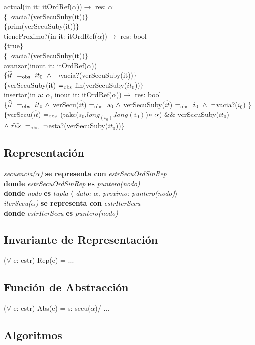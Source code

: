 actual(in it: itOrdRef($\alpha$))$\longrightarrow$ res: $\alpha$\\
$\{\neg$vacia?(verSecuSuby(it))$\}$\\
$\{$prim(verSecuSuby(it))$\}$\\

tieneProximo?(in it: itOrdRef($\alpha$))$\longrightarrow$ res: bool\\
$\{$true$\}$\\
$\{\neg$vacia?(verSecuSuby(it))$\}$\\

avanzar(inout it: itOrdRef($\alpha$))\\
$\{\widehat{it}\ \igobs\ it_0\ \wedge\ \neg$vacia?(verSecuSuby(it))$\}$\\
$\{$verSecuSuby(it) $=_{\mathrm{obs}}$ fin(verSecuSuby($it_0$))$\}$\\

insertar(in a: $\alpha$, inout it: itOrdRef($\alpha$))$\longrightarrow$ res: bool\\
$\{\widehat{it}\ =_{\mathrm{obs}}\ it_0\ \wedge$ verSecu($\widehat{it}$) $=_{\mathrm{obs}}\ s_0\ \wedge$ verSecuSuby($\widehat{it}$) $\igobs\ i_0\ \wedge\ \neg$vacia?($i_0$) $\}$\\
$\{$verSecu($\widehat{it}$) $=_{\mathrm{obs}}$ (take($s_0$,$long_(s_0)$,$long(i_0)$)$\circ\ \alpha$) $\& \&$ verSecuSuby($it_0$) $\wedge\ \widehat{res}\ \igobs\ \neg$esta?(verSecuSuby($it_0$))$\}$


\subsection*{Representaci\'on}
\textit{secuencia($\alpha$)} \textbf{se representa con} \textit{estrSecuOrdSinRep}\\
\textbf{donde} \textit{estrSecuOrdSinRep} \textbf{es} \textit{puntero(nodo)}\\
\textbf{donde} \textit{nodo} \textbf{es} \textit{tupla $\langle$ dato: $\alpha$, proximo: puntero(nodo)$\rangle$}\\

\textit{iterSecu($\alpha$)} \textbf{se representa con} \textit{estrIterSecu}\\
\textbf{donde} \textit{estrIterSecu} \textbf{es} \textit{puntero(nodo)}\\

\subsection*{Invariante de Representaci\'on}
\vspace{11pt}
($\forall$ e: estr) Rep(e) = ...
\vspace{33pt}

\subsection*{Funci\'on de Abstracci\'on}
\vspace{11pt}
($\forall$ e: estr) Abs(e) = s: secu($\alpha$)/ ...
\vspace{33pt}

\subsection*{Algoritmos}

